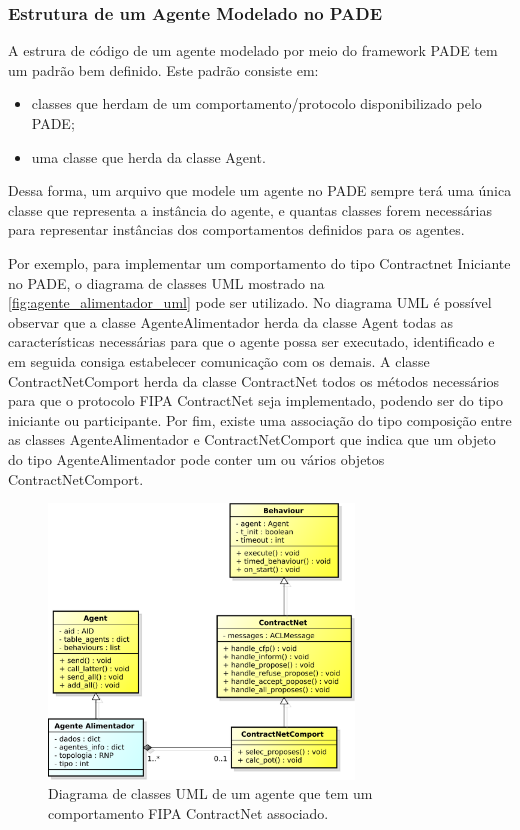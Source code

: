 \documentclass[journal]{IEEEtran}
\begin{document}
\subsubsection{Estrutura de um Agente Modelado no PADE}

A estrura de código de um agente modelado por meio do framework PADE tem um padrão bem definido. Este padrão consiste em:

\begin{itemize}
    \item classes que herdam de um comportamento/protocolo disponibilizado pelo PADE;
    \item uma classe que herda da classe Agent.
\end{itemize}

Dessa forma, um arquivo que modele um agente no PADE sempre terá uma única classe que representa a instância do agente, e quantas classes forem necessárias para representar instâncias dos comportamentos definidos para os agentes.

Por exemplo, para implementar um comportamento do tipo Contractnet Iniciante no PADE, o diagrama de classes UML mostrado na \autoref{fig:agente_alimentador_uml} pode ser utilizado. No diagrama UML é possível observar que a classe AgenteAlimentador herda da classe Agent todas as características necessárias para que o agente possa ser executado, identificado e em seguida consiga estabelecer comunicação com os demais. A classe ContractNetComport herda da classe ContractNet todos os métodos necessários para que o protocolo FIPA ContractNet seja implementado, podendo ser do tipo iniciante ou participante. Por fim, existe uma associação do tipo composição entre as classes AgenteAlimentador e ContractNetComport que indica que um objeto do tipo AgenteAlimentador pode conter um ou vários objetos ContractNetComport.

\begin{figure}[!htb]
    \centering
    \includegraphics[width=3.2in]{Figuras/agente_alimentador.eps}
    \caption{\label{fig:agente_alimentador_uml} Diagrama de classes UML de um agente que tem um comportamento FIPA ContractNet associado.}
\end{figure}
\end{document}
